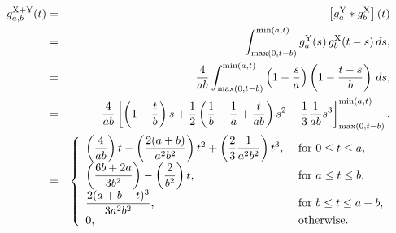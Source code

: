\begin{eqnarray}
    g^{\rm X+Y}_{a,b}(t) 
       & = & \left[ g^{\rm Y}_a *  g^{\rm X}_b \right] (t) \nonumber \\
\full{       & = & \int_{-\infty}^{\infty} g^{\rm Y}_a(s)  \, g^{\rm X}_b(t-s) \, ds,  \nonumber \\}
       & = & \int_{\max(0,t-b)}^{\min(a,t)} g^{\rm Y}_a(s)  \, g^{\rm X}_b(t-s) \, ds,  \nonumber \\
       & = & \frac{4}{a b} \int_{\max(0,t-b)}^{\min(a,t)}  
              \left( 1-\frac{s}{a} \right) 
              \left( 1-\frac{t-s}{b} \right)  \, ds,  \nonumber \\
\full{       & = & \frac{4}{a b} \int_{\max(0,t-b)}^{\min(a,t)} 
                   \left( 1 - \frac{t}{b} \right)  
                    + \left( \frac{1}{b} - \frac{1}{a} + \frac{t}{a b} \right)  s  
                    - \frac{1}{a b}  s^2 
                \, ds,  \nonumber \\}
       & = & \frac{4}{a b} \left[ \left( 1 - \frac{t}{b} \right) s
              + \frac{1}{2} \left( \frac{1}{b} - \frac{1}{a} + \frac{t}{a b} \right)  s^2 
              - \frac{1}{3} \frac{1}{a b}  s^3
                  \right]_{\max(0,t-b)}^{\min(a,t)},  \nonumber \\
\full{       & = & \left\{ \begin{array}{ll}
           \displaystyle
           \frac{4}{a b} \left( 1 - \frac{t}{b} \right) t
              + \frac{2}{a b} \left( \frac{1}{b} - \frac{1}{a} + \frac{t}{a b} \right)  t^2 
              - \frac{4}{3} \frac{1}{a^2 b^2}  t^3, & \mbox{ for } 0 \leq t \leq a, \\
           \displaystyle
           \frac{4}{a b}  \left( 1 - \frac{t}{b} \right) a
              + \frac{2}{a b} \left( \frac{1}{b} - \frac{1}{a} + \frac{t}{a b} \right)  a^2 
              - \frac{4}{3} \frac{1}{a^2 b^2}  a^3, & \mbox{ for } a \leq t \leq b, \\
           \displaystyle
             \frac{4}{a^2 b^2} \int_{0}^{a+b-t} 
                    u(a+b-t - u) \, du
                , & \mbox{ for } b \leq t \leq a + b , \\
                \end{array} \right. \nonumber \\}
       & = & \left\{ \begin{array}{ll}
           \displaystyle
           \left(\frac{4}{a b}\right) t
              - \left(\frac{2(a+b)}{a^2 b^2} \right) t^2
              + \left(\frac{2}{3} \frac{1}{a^2 b^2}\right)  t^3, & \mbox{ for } 0 \leq t \leq a, \\
           \displaystyle
                   \left( \frac{6b + 2a}{3b^2} \right)
              - \left( \frac{2}{b^2}  \right) t, & \mbox{ for } a \leq t \leq b, \\
           \displaystyle
              \frac{2(a+b-t)^3}{3 a^2 b^2}
                     , & \mbox{ for } b \leq t \leq a + b,  \\
           \displaystyle
             0, & \mbox{ otherwise}.
                \end{array} \right.
\end{eqnarray}
